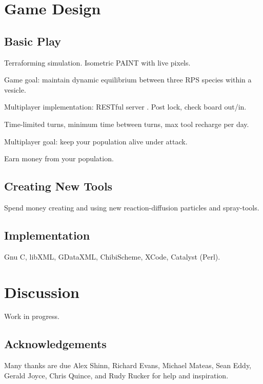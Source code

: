 \documentclass{acm_proc_article-sp}
\begin{document}
\section{Game Design}

\subsection{Basic Play}

Terraforming simulation.
Isometric PAINT with live pixels.

Game goal: maintain dynamic equilibrium between three RPS species within a vesicle.

Multiplayer implementation: RESTful server \cite{rest}.
Post lock, check board out/in.

Time-limited turns, minimum time between turns, max tool recharge per day.

Multiplayer goal: keep your population alive under attack.

Earn money from your population.

\subsection{Creating New Tools}

Spend money creating and using new reaction-diffusion particles and spray-tools.

\subsection{Implementation}

Gnu C, libXML, GDataXML, ChibiScheme, XCode, Catalyst (Perl).

\section{Discussion}

Work in progress.

\subsection{Acknowledgements}

Many thanks are due Alex Shinn, Richard Evans, Michael Mateas, Sean Eddy, Gerald Joyce, Chris Quince,
and Rudy Rucker for help and inspiration.




\balancecolumns
\end{document}
